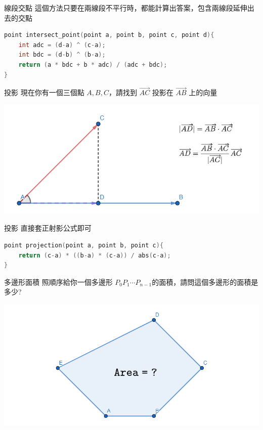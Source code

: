 \documentclass[aspectratio=169]{beamer}
\begin{document}
\begin{frame}[fragile]{線段交點}
    這個方法只要在兩線段不平行時，都能計算出答案，包含兩線段延伸出去的交點
    \begin{lstlisting}[language=C++,basicstyle=\ttfamily\small]
point intersect_point(point a, point b, point c, point d){
    int adc = (d-a) ^ (c-a);
    int bdc = (d-b) ^ (b-a);
    return (a * bdc + b * adc) / (adc + bdc);
}
    \end{lstlisting}
\end{frame}

\begin{frame}[fragile]{投影}
    現在你有一個三個點 $A,B,C$，請找到 $\overrightarrow{AC}$ 投影在 $\overrightarrow{AB}$ 上的向量
    \begin{center}
        \includegraphics[scale=0.5]{images/projection.png}
    \end{center}
\end{frame}

\begin{frame}[fragile]{投影}
    直接套正射影公式即可
    \begin{lstlisting}[language=C++,basicstyle=\ttfamily\small]
point projection(point a, point b, point c){
    return (c-a) * ((b-a) * (c-a)) / abs(c-a);
}
    \end{lstlisting}
\end{frame}

\begin{frame}{多邊形面積}
    照順序給你一個多邊形 $P_0 P_1\cdots P_{n-1}$的面積，請問這個多邊形的面積是多少?
    \begin{center}
        \includegraphics[scale=0.5]{images/polygon_area.png}
    \end{center}
\end{frame}
\end{document}
